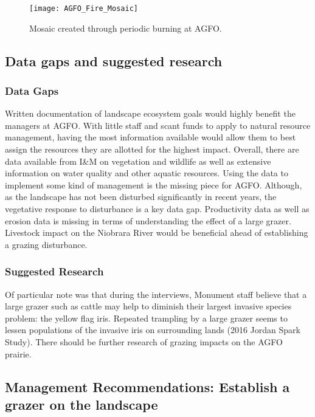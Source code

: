 \begin{figure} 
	\centering
	\texttt{[image: AGFO\_Fire\_Mosaic]}
	\caption{Mosaic created through periodic burning at AGFO.} \label{fig:AGFOFireMosaic}
\end{figure}

\subsection{Data gaps and suggested research}

\subsubsection{Data Gaps}

Written documentation of landscape ecosystem goals would highly benefit the managers at AGFO. 
With little staff and scant funds to apply to natural resource management, having the most information available would allow them to best assign the resources they are allotted for the highest impact. 
Overall, there are data available from I\&M on vegetation and wildlife as well as extensive information on water quality and other aquatic resources. 
Using the data to implement some kind of management is the missing piece for AGFO. 
Although, as the landscape has not been disturbed significantly in recent years, the vegetative response to disturbance is a key data gap. 
Productivity data as well as erosion data is missing in terms of understanding the effect of a large grazer.
Livestock impact on the Niobrara River would be beneficial ahead of establishing a grazing disturbance.

\subsubsection{Suggested Research}

Of particular note was that during the interviews, Monument staff believe that a large grazer such as cattle may help to diminish their largest invasive species problem: the yellow flag iris. 
Repeated trampling by a large grazer seems to lessen populations of the invasive iris on surrounding lands (2016 Jordan Spark Study). 
There should be further research of grazing impacts on the AGFO prairie.

\subsection{Management Recommendations: Establish a grazer on the landscape}

